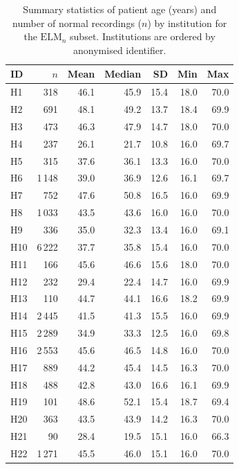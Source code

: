 \documentclass[preprint,12pt]{elsarticle}
\begin{document}
\begin{table}[htbp]
  \centering
  \caption{Summary statistics of patient age (years) and number of
    normal recordings ($n$) by institution for the $\mathrm{ELM}_n$
    subset. Institutions are ordered by anonymised identifier.}
  \label{tab:age_stats}
  \begin{tabular}{lrrrrrr}
    \toprule
    \textbf{ID} & \textbf{$n$} & \textbf{Mean} & \textbf{Median} &
    \textbf{SD} & \textbf{Min} & \textbf{Max} \\
    \midrule
    H1  &   318 & 46.1 & 45.9 & 15.4 & 18.0 & 70.0 \\
    H2  &   691 & 48.1 & 49.2 & 13.7 & 18.4 & 69.9 \\
    H3  &   473 & 46.3 & 47.9 & 14.7 & 18.0 & 70.0 \\
    H4  &   237 & 26.1 & 21.7 & 10.8 & 16.0 & 69.7 \\
    H5  &   315 & 37.6 & 36.1 & 13.3 & 16.0 & 70.0 \\
    H6  & 1\,148 & 39.0 & 36.9 & 12.6 & 16.1 & 69.7 \\
    H7  &   752 & 47.6 & 50.8 & 16.5 & 16.0 & 69.9 \\
    H8  & 1\,033 & 43.5 & 43.6 & 16.0 & 16.0 & 70.0 \\
    H9  &   336 & 35.0 & 32.3 & 13.4 & 16.0 & 69.1 \\
    H10 & 6\,222 & 37.7 & 35.8 & 15.4 & 16.0 & 70.0 \\
    H11 &   166 & 45.6 & 46.6 & 15.6 & 18.0 & 70.0 \\
    H12 &   232 & 29.4 & 22.4 & 14.7 & 16.0 & 69.9 \\
    H13 &   110 & 44.7 & 44.1 & 16.6 & 18.2 & 69.9 \\
    H14 & 2\,445 & 41.5 & 41.3 & 15.5 & 16.0 & 69.9 \\
    H15 & 2\,289 & 34.9 & 33.3 & 12.5 & 16.0 & 69.8 \\
    H16 & 2\,553 & 45.6 & 46.5 & 14.8 & 16.0 & 70.0 \\
    H17 &   889 & 44.2 & 45.4 & 14.5 & 16.3 & 70.0 \\
    H18 &   488 & 42.8 & 43.0 & 16.6 & 16.1 & 69.9 \\
    H19 &   101 & 48.6 & 52.1 & 15.4 & 18.7 & 69.4 \\
    H20 &   363 & 43.5 & 43.9 & 14.2 & 16.3 & 70.0 \\
    H21 &    90 & 28.4 & 19.5 & 15.1 & 16.0 & 66.3 \\
    H22 & 1\,271 & 45.5 & 46.0 & 15.1 & 16.0 & 70.0 \\

\end{tabular}
\end{table}
\end{document}
